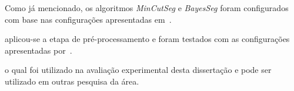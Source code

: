 
























Como já mencionado, os algoritmos \textit{MinCutSeg} e \textit{BayesSeg} foram configurados com base nas configurações apresentadas em~\cite{Eis2008}. 





aplicou-se a etapa de pré-processamento e foram testados com as configurações apresentadas por~\cite{Eis2008}. 































o qual foi utilizado na avaliação experimental desta dissertação e pode ser utilizado em outras pesquisa da área.









































